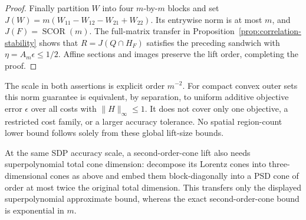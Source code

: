 \begin{proof}
Finally partition $W$ into four $m$-by-$m$ blocks and set
$J(W)=m(W_{11}-W_{12}-W_{21}+W_{22})$.
Its entrywise norm is at most $m$, and $J(F)=\operatorname{SCOR}(m)$.
The full-matrix transfer in Proposition~\ref{prop:correlation-stability}
shows that $R=J(Q\cap H_F)$ satisfies the preceding sandwich with
$\eta=A_m\epsilon\le1/2$. Affine sections and images preserve the lift
order, completing the proof.
\end{proof}
The scale in both assertions is explicit order $m^{-2}$. For compact
convex outer sets this norm guarantee is equivalent, by separation, to
uniform additive objective error $\epsilon$ over all costs with
$\|H\|_\infty\le1$. It does not cover only one objective, a restricted
cost family, or a larger accuracy tolerance. No spatial region-count
lower bound follows solely from these global lift-size bounds.

At the same SDP accuracy scale, a second-order-cone lift also needs
superpolynomial total cone dimension: decompose its Lorentz cones into
three-dimensional cones as above and embed them block-diagonally into
a PSD cone of order at most twice the original total dimension. This
transfers only the displayed superpolynomial approximate bound, whereas
the exact second-order-cone bound is exponential in $m$.
